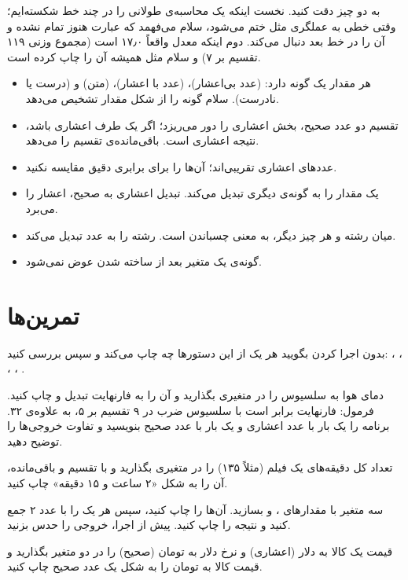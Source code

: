 به دو چیز دقت کنید. نخست اینکه یک محاسبه‌ی طولانی را در چند خط شکسته‌ایم؛
وقتی خطی به عملگری مثل \code{+} ختم می‌شود، سلام می‌فهمد که عبارت هنوز
تمام نشده و آن را در خط بعد دنبال می‌کند. دوم اینکه معدل واقعاً ۱۷٫۰ است (مجموع وزنی ۱۱۹ تقسیم بر ۷) و
سلام مثل همیشه آن را  چاپ کرده است.

\begin{summary}
\begin{itemize}
  \item هر مقدار یک گونه دارد:  (عدد بی‌اعشار)، 
        (عدد با اعشار)،  (متن) و  (درست یا
        نادرست). سلام گونه را از شکل مقدار تشخیص می‌دهد.
  \item تقسیم دو عدد صحیح، بخش اعشاری را دور می‌ریزد؛ اگر یک طرف اعشاری
        باشد، نتیجه اعشاری است. \code{\%}
        باقی‌مانده‌ی تقسیم را می‌دهد.
  \item عددهای اعشاری تقریبی‌اند؛ آن‌ها را برای برابری دقیق مقایسه نکنید.
  \item {} یک مقدار را به گونه‌ی دیگری تبدیل می‌کند.
        تبدیل اعشاری به صحیح، اعشار را می‌برد.
  \item \code{+} میان رشته و هر چیز دیگر، به معنی چسباندن است.
         رشته را به عدد تبدیل می‌کند.
  \item گونه‌ی یک متغیر بعد از ساخته شدن عوض نمی‌شود.
\end{itemize}
\end{summary}

\section*{تمرین‌ها}

\exercise بدون اجرا کردن بگویید هر یک از این دستورها چه چاپ می‌کند و سپس
بررسی کنید: ، ، ،
، .

\exercise دمای هوا به سلسیوس را در متغیری بگذارید و آن را به فارنهایت تبدیل
و چاپ کنید. فرمول: فارنهایت برابر است با سلسیوس ضرب در ۹ تقسیم بر ۵،
به علاوه‌ی ۳۲. برنامه را یک بار با عدد اعشاری و یک بار با عدد صحیح
بنویسید و تفاوت خروجی‌ها را توضیح دهید.

\exercise تعداد کل دقیقه‌های یک فیلم (مثلاً ۱۳۵) را در متغیری بگذارید و
با تقسیم و باقی‌مانده، آن را به شکل «۲ ساعت و ۱۵ دقیقه» چاپ کنید.

\exercise سه متغیر با مقدارهای ،  و  بسازید.
آن‌ها را چاپ کنید، سپس هر یک را با عدد ۲ جمع کنید و نتیجه را چاپ کنید.
پیش از اجرا، خروجی را حدس بزنید.

\exercise قیمت یک کالا به دلار (اعشاری) و نرخ دلار به تومان (صحیح) را در
دو متغیر بگذارید و قیمت کالا به تومان را به شکل یک عدد صحیح چاپ کنید.
